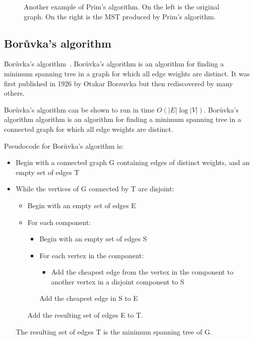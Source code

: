 \begin{figure}[!htbp]
\centering

\caption{Another example of Prim's algorithm. On the left is the
  original graph. On the right is the MST produced by Prim's algorithm.}
\label{fig:tree-forests:Prim_algorithm_digraph2}
\end{figure}



\subsection{Bor\r{u}vka's algorithm}
\label{subsec:trees_forests:Boruvka_algorithm}

Bor\r{u}vka's
algorithm~\cite{Boruvka1926a,Boruvka1926b}. Bor\r{u}vka's algorithm is
an algorithm for finding a minimum spanning tree in a graph for which
all edge weights are distinct. It was first published in 1926 by
Otakar Bor\o uvka but then rediscovered by many others.

Bor\r{u}vka's algorithm can be shown to run in time
$O(|E|\log |V|)$.
Bor\r{u}vka's algorithm algorithm is an algorithm
for finding a minimum spanning tree in a connected graph for
which all edge weights are distinct.

Pseudocode for Bor\r{u}vka's algorithm is:

\begin{itemize}
\item
Begin with a connected graph G containing edges of distinct
 weights, and an empty set of edges T
\item
While the vertices of G connected by T are disjoint:
\begin{itemize}
\item
Begin with an empty set of edges E
\item
         For each component:
\begin{itemize}
\item
        Begin with an empty set of edges S
\item
        For each vertex in the component:
 \begin{itemize}
\item
Add the cheapest edge from the vertex in
             the component to another vertex in a disjoint component to S
\end{itemize}
        Add the cheapest edge in S to E
\end{itemize}
    Add the resulting set of edges E to T.
\end{itemize}
The resulting set of edges T is the minimum spanning tree of G.
\end{itemize}

